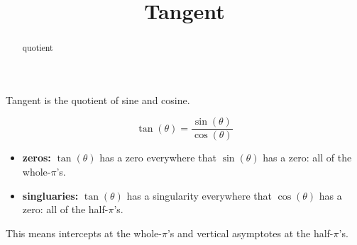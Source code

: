 \documentclass{ximera}
\title{Tangent}
\begin{document}
\begin{abstract}
quotient
\end{abstract}
\maketitle







Tangent is the quotient of sine and cosine.

\[   \tan(\theta)  =  \frac{\sin(\theta)}{\cos(\theta)}  \]


\begin{itemize}
\item \textbf{zeros:} $\tan(\theta)$ has a zero everywhere that $\sin(\theta)$ has a zero:  all of the whole-$\pi$'s.
\item \textbf{singluaries:} $\tan(\theta)$ has a singularity everywhere that $\cos(\theta)$ has a zero:  all of the half-$\pi$'s.
\end{itemize}

This means intercepts at the whole-$\pi$'s and vertical asymptotes at the half-$\pi$'s.
\end{document}
